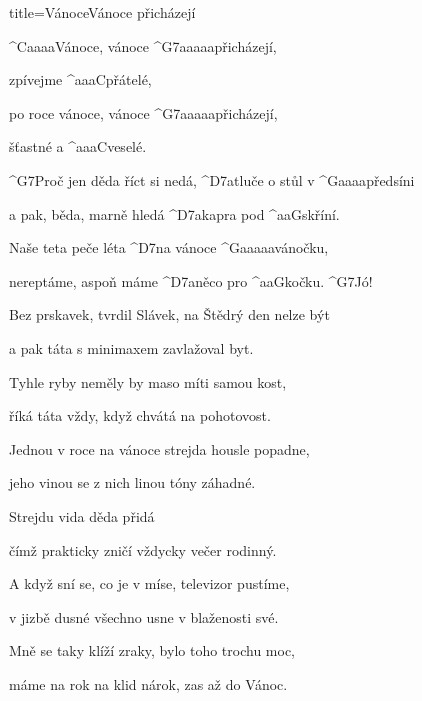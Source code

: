 \begin{song}{title=\predtitle\centering Vánoce\carka Vánoce přicházejí \\\large   \vspace*{-0.3cm}}  %
\begin{centerjustified}
\nejvetsi

	^{C{\color{white}aaaa}}Vánoce, vánoce ^{G7{\color{white}aaaaa}}přicházejí, 

	zpívejme ^{{\color{white}aaa}C}přátelé,

	po roce vánoce, vánoce ^{G7{\color{white}aaaaa}}přicházejí,

	šťastné a ^{{\color{white}aaa}C}veselé.

\sloka
	^{G7}Proč jen děda říct si nedá, ^{D7{\color{white}a}}tluče o stůl v ^{G{\color{white}aaaa}}předsíni

	a pak, běda, marně hledá ^{D7{\color{white}a}}kapra pod ^{{\color{white}aa}G}skříní.

	Naše teta peče léta ^{D7}na vánoce ^{G{\color{white}aaaaa}}vánočku,

	nereptáme, aspoň máme ^{D7{\color{white}a}}něco pro ^{{\color{white}aa}G}kočku.  ^{G7}Jó!


\sloka
	Bez prskavek, tvrdil Slávek, na Štědrý den nelze být

	a pak táta s minimaxem zavlažoval byt.

	Tyhle ryby neměly by maso míti samou kost,

	říká táta vždy, když chvátá na pohotovost.



\sloka
	Jednou v roce na vánoce strejda housle popadne,

	jeho vinou se z nich linou tóny záhadné.

	Strejdu vida děda přidá 

	čímž prakticky zničí vždycky večer rodinný.



\sloka
	A když sní se, co je v míse, televizor pustíme,

	v jizbě dusné všechno usne v blaženosti své.

	Mně se taky klíží zraky, bylo toho trochu moc,

	máme na rok na klid nárok, zas až do Vánoc.




\end{centerjustified}
\setcounter{Slokočet}{0}
\end{song}

